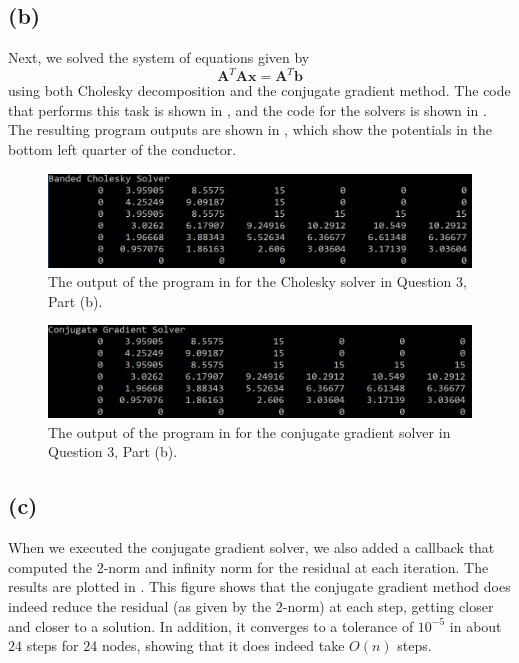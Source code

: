 \documentclass[journal,hidelinks]{IEEEtran}
\begin{document}
\subsection*{(b)}

Next, we solved the system of equations given by
\begin{equation}
\boldsymbol{A}^T \boldsymbol{A} \boldsymbol{x} = \boldsymbol{A}^T \boldsymbol{b}
\end{equation}
using both Cholesky decomposition and the conjugate gradient method. The code that performs this task is shown in , and the code for the solvers is shown in . The resulting program outputs are shown in , which show the potentials in the bottom left quarter of the conductor.

\begin{figure}[!htb]
  \centering
  \includegraphics[width=\columnwidth]{question-3/cholesky.png}
  \caption{The output of the program in  for the Cholesky solver in Question 3, Part (b).}
  \label{fig:cholesky}
\end{figure}

\begin{figure}[!htb]
  \centering
  \includegraphics[width=\columnwidth]{question-3/cg.png}
  \caption{The output of the program in  for the conjugate gradient solver in Question 3, Part (b).}
  \label{fig:cg}
\end{figure}

\subsection*{(c)}

When we executed the conjugate gradient solver, we also added a callback that computed the 2-norm and infinity norm for the residual at each iteration. The results are plotted in . This figure shows that the conjugate gradient method does indeed reduce the residual (as given by the 2-norm) at each step, getting closer and closer to a solution. In addition, it converges to a tolerance of $10^{-5}$ in about $24$ steps for $24$ nodes, showing that it does indeed take $O(n)$ steps.
\end{document}
